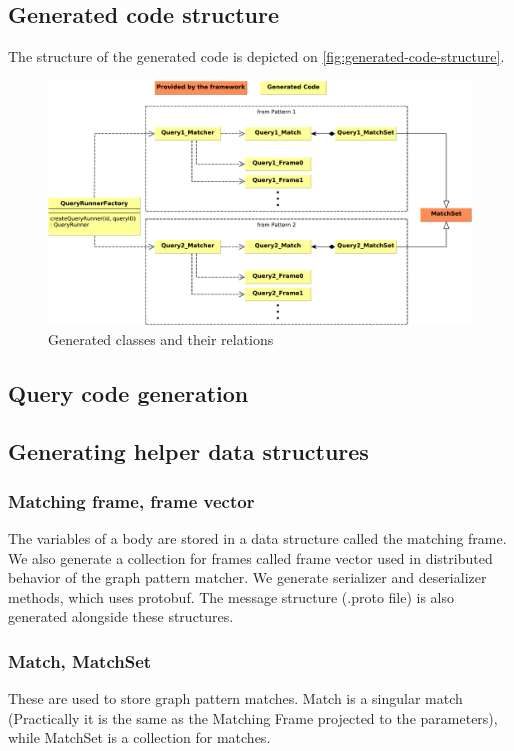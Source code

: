 \subsection{Generated code structure}

The structure of the generated code is depicted on \autoref{fig:generated-code-structure}.


\begin{figure}
	\begin{center}
		\includegraphics[width=\textwidth]{figures/generated-code-structure.pdf}
		\caption{Generated classes and their relations}
		\label{fig:generated-code-structure}
	\end{center}
\end{figure}

\subsection{Query code generation}




\subsection{Generating helper data structures}

\subsubsection{Matching frame, frame vector}

The variables of a body are stored in a data structure called the matching frame.
We also generate a collection for frames called frame vector used in distributed behavior of the graph pattern matcher.
We generate serializer and deserializer methods, which uses protobuf.
The message structure (.proto file) is also generated alongside these structures.

\subsubsection{Match, MatchSet}

These are used to store graph pattern matches. Match is a singular match (Practically it is the same as the Matching Frame projected to the parameters), while MatchSet is a collection for matches.













